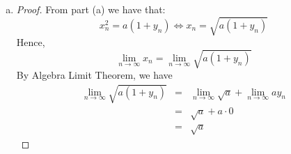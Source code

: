 \documentclass[10pt,letterpaper]{article}
\begin{document}
\begin{enumerate}[(a)]
	\item
	\begin{proof} 
	From part (a) we have that:
	$$x_n^2 = a(1 + y_n) \Leftrightarrow x_n = \sqrt{a(1 + y_n)}$$ 
	Hence,
	$$\displaystyle\lim_{n\to\infty}x_n = \displaystyle\lim_{n\to\infty} \sqrt{a(1 + y_n)}$$
	By Algebra Limit Theorem, we have
	\begin{eqnarray*}
		\displaystyle\lim_{n\to\infty} \sqrt{a(1 + y_n)} &=&
		\displaystyle\lim_{n\to\infty} \sqrt{a}  + \displaystyle\lim_{n\to\infty}ay_n \\
		&=& \sqrt{a} + a \cdot 0 \\
		&=& \sqrt{a}
	\end{eqnarray*}
	\end{proof}

	\end{enumerate}
	
\end{document}
